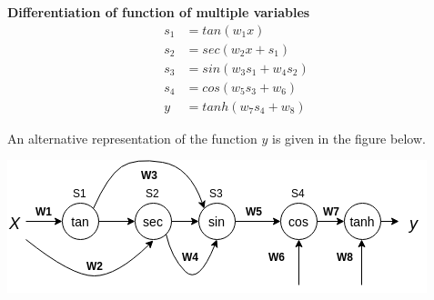 \documentclass[solution,addpoints,12pt]{exam}
\begin{document}
\begin{questions}

\question
\textbf{Differentiation of function of multiple variables}
          \begin{equation*}
            \begin{aligned}
              s_1 & = tan(w_1 x) \\
              s_2 & = sec(w_2 x + s_1) \\
              s_3 & = sin(w_3 s_1 + w_4 s_2) \\
              s_4 & = cos(w_5 s_3 + w_6) \\
              y   & = tanh(w_7 s_4 + w_8)
            \end{aligned}
          \end{equation*}

          An alternative representation of the function $y$ is given in the figure below.
          \begin{center}
            \includegraphics[scale=0.7]{fig2.png}
          \end{center}


\end{questions}
\end{document}
